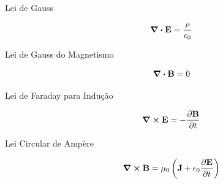 \begin{description}
    \item[Lei de Gauss] 
                    $$\div{\textbf{E}} = \frac{\rho}{\epsilon_{0}}$$
    \item[Lei de Gauss do Magnetismo]
                    $$ \div{\textbf{B}} = 0 $$
                    
    \item[Lei de Faraday para Indução]
                    $$\curl{\textbf{E}} = -\frac{\partial \textbf{B}}{\partial t}$$
    \item[Lei Circular de Ampère]
                    $$\curl{\textbf{B}} = \mu_{0} \left( \textbf{J} + \epsilon_0 \frac{\partial \textbf{E}}{\partial t} \right)$$
\end{description}